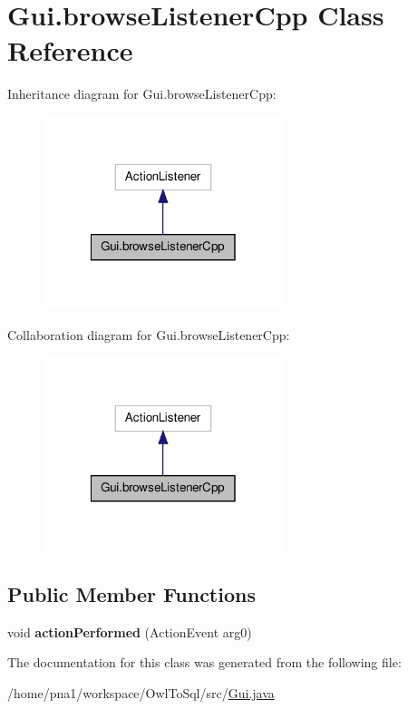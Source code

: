 \hypertarget{class_gui_1_1browse_listener_cpp}{
\section{Gui.browseListenerCpp Class Reference}
\label{class_gui_1_1browse_listener_cpp}
}


Inheritance diagram for Gui.browseListenerCpp:\nopagebreak
\begin{figure}[H]
\begin{center}
\leavevmode
\includegraphics[width=198pt]{class_gui_1_1browse_listener_cpp__inherit__graph}
\end{center}
\end{figure}


Collaboration diagram for Gui.browseListenerCpp:\nopagebreak
\begin{figure}[H]
\begin{center}
\leavevmode
\includegraphics[width=198pt]{class_gui_1_1browse_listener_cpp__coll__graph}
\end{center}
\end{figure}
\subsection*{Public Member Functions}
\begin{DoxyCompactItemize}
\item 
\hypertarget{class_gui_1_1browse_listener_cpp_ad1b5579e88a5396a5d23c75b820772e2}{
void {\bfseries actionPerformed} (ActionEvent arg0)}
\label{class_gui_1_1browse_listener_cpp_ad1b5579e88a5396a5d23c75b820772e2}

\end{DoxyCompactItemize}


The documentation for this class was generated from the following file:\begin{DoxyCompactItemize}
\item 
/home/pna1/workspace/OwlToSql/src/\hyperlink{_gui_8java}{Gui.java}\end{DoxyCompactItemize}
